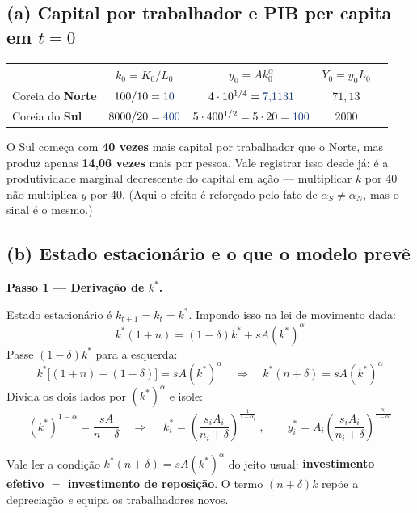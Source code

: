 \documentclass[11pt, a4paper]{article}
\newcommand{\passo}[1]{\medskip\noindent\textbf{#1}\par\nobreak}
\newcommand{\resp}[1]{%
  \ifmmode {\color{darkblue}#1}\else\textcolor{darkblue}{\textbf{#1}}\fi}
\newcommand{\stst}{^{\ast}}
\begin{document}
\subsection*{(a) Capital por trabalhador e PIB per capita em $t=0$}

\begin{center}
\small
\begin{tabular}{lcccc}
\toprule
 & $k_0 = K_0/L_0$ & $y_0 = A k_0^{\alpha}$ & $Y_0 = y_0 L_0$ \\
\midrule
Coreia do \textbf{Norte} & $100/10 = \resp{10}$
  & $4 \cdot 10^{1/4} = \resp{7{,}1131}$ & $71{,}13$ \\
Coreia do \textbf{Sul}   & $8000/20 = \resp{400}$
  & $5 \cdot 400^{1/2} = 5 \cdot 20 = \resp{100}$ & $2000$ \\
\bottomrule
\end{tabular}
\end{center}

O Sul começa com \textbf{40 vezes} mais capital por trabalhador que o Norte, mas produz
apenas \textbf{14,06 vezes} mais por pessoa. Vale registrar isso desde já: é a
produtividade marginal decrescente do capital em ação --- multiplicar $k$ por 40 não
multiplica $y$ por 40. (Aqui o efeito é reforçado pelo fato de $\alpha_S \ne \alpha_N$, mas
o sinal é o mesmo.)

\subsection*{(b) Estado estacionário e o que o modelo prevê}

\passo{Passo 1 --- Derivação de $k\stst$.} Estado estacionário é $k_{t+1} = k_t = k\stst$.
Impondo isso na lei de movimento dada:
$$k\stst (1+n) = (1-\delta)k\stst + s A (k\stst)^{\alpha}$$
Passe $(1-\delta)k\stst$ para a esquerda:
$$k\stst\big[(1+n) - (1-\delta)\big] = s A (k\stst)^{\alpha}
\quad\Longrightarrow\quad k\stst (n+\delta) = s A (k\stst)^{\alpha}$$
Divida os dois lados por $(k\stst)^{\alpha}$ e isole:
$$(k\stst)^{1-\alpha} = \frac{sA}{n+\delta}
\quad\Longrightarrow\quad
\boxed{\;k\stst_i = \left(\frac{s_i A_i}{n_i+\delta}\right)^{\frac{1}{1-\alpha_i}}
\;,\qquad
y\stst_i = A_i\left(\frac{s_i A_i}{n_i+\delta}\right)^{\frac{\alpha_i}{1-\alpha_i}}}$$

Vale ler a condição $k\stst(n+\delta) = sA(k\stst)^{\alpha}$ do jeito usual:
\textbf{investimento efetivo $=$ investimento de reposição}. O termo $(n+\delta)k$ repõe a
depreciação \emph{e} equipa os trabalhadores novos.
\end{document}
